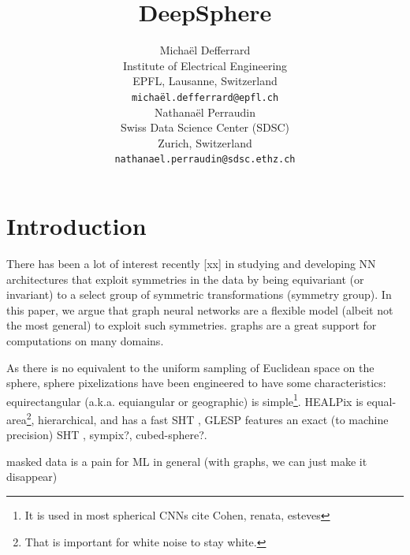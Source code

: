 \documentclass{article} %
\title{DeepSphere}
\author{Michaël Defferrard \\
Institute of Electrical Engineering \\
EPFL, Lausanne, Switzerland \\
\texttt{michaël.defferrard@epfl.ch} \\
\And
Nathanaël Perraudin \\
Swiss Data Science Center (SDSC) \\
Zurich, Switzerland \\
\texttt{nathanael.perraudin@sdsc.ethz.ch} \\
}
\newcommand{\1}{\b{1}}              %
\newcommand{\0}{\b{0}}              %
\newcommand{\todo}[1]{{\color[rgb]{.6,.1,.6}{#1}}}
\begin{document}
\maketitle

\begin{abstract}
	\todo{TODO:
		\begin{enumerate}
			\item add figures from DeepSphere cosmo
			\item reorganize thoughts
			\item fill the holes
			\item coherent and consistent story
		\end{enumerate}
	}
\end{abstract}

\section{Introduction}

There has been a lot of interest recently [xx] in studying and developing NN architectures that exploit symmetries in the data by being equivariant (or invariant) to a select group of symmetric transformations (symmetry group).
In this paper, we argue that graph neural networks are a flexible model (albeit not the most general) to exploit such symmetries.
graphs are a great support for computations on many domains.

\todo{Related work as a paragraph. Mention interest in spherical CNNs for various applications, importance of equivariance and invariance, previous exploratory work from Renata and ourselves.}

As there is no equivalent to the uniform sampling of Euclidean space on the sphere, sphere pixelizations have been engineered to have some characteristics: equirectangular (a.k.a. equiangular or geographic) is simple\footnote{It is used in most spherical CNNs cite Cohen, renata, esteves}. HEALPix is equal-area\footnote{That is important for white noise to stay white.}, hierarchical, and has a fast SHT \citep{healpix}, GLESP features an exact (to machine precision) SHT \citep{glesp}, sympix?, cubed-sphere?.
\todo{look at the wording in sympix}
\todo{maybe have a table, or a list of desired properties from a sampling}

\todo{What is the problem we want to solve? Identify it. Our solution: allow any sampling, flexibility.}
\todo{there is a compromise about the sampling quality (how far from uniform) and how close discrete computations can be made to the true continuous ones}
masked data is a pain for ML in general (with graphs, we can just make it disappear)
\end{document}
